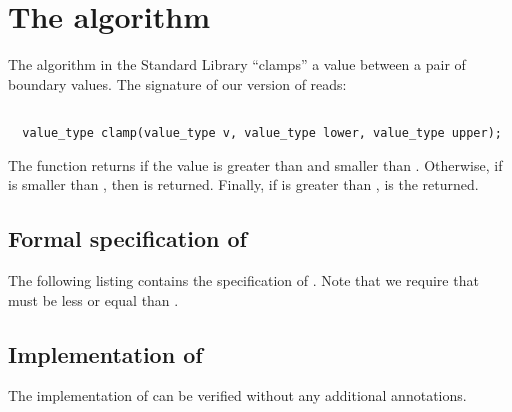 
\section{The \clamp algorithm}
\label{sec:clamp}


The \clamp algorithm in the \cxx Standard Library \cite[\S 28.7.9]{cxx-17-draft} ``clamps'' a value
between a pair of boundary values.
The signature of our version of \clamp reads:

\begin{lstlisting}[style = acsl-block]

  value_type clamp(value_type v, value_type lower, value_type upper);
\end{lstlisting}

The function \clamp returns  if the value is greater
than  and smaller than .
Otherwise, if  is smaller than , then  is returned.
Finally, if  is greater than ,  is the returned.

\subsection{Formal specification of \clamp}

The following listing contains the specification of .
Note that we require that  must be less or equal than .



\clearpage

\subsection{Implementation of \clamp}

The implementation of  can be verified without any additional annotations.




